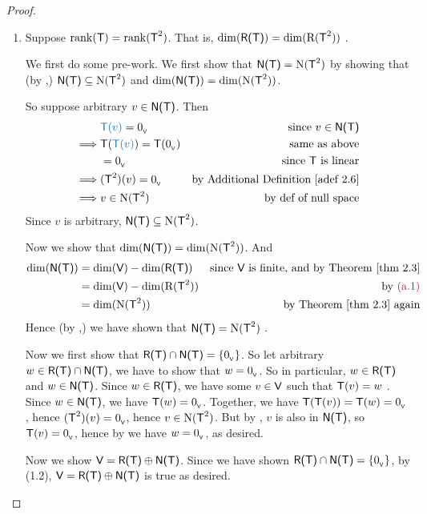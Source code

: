 \begin{proof} \ 

\begin{enumerate}
\item Suppose \(\mathrm{rank}(\textsf{T}) = \mathrm{rank}(\textsf{T}^2)\).
That is, \(\dim(\textsf{R(T)}) = \dim(\mathrm{R}(\textsf{T}^2))\) .

We first do some pre-work.
We first show that \(\textsf{N(T)} = \mathrm{N}(\textsf{T}^2)\) by showing that (by ,) \(\textsf{N(T)} \subseteq \mathrm{N}(\textsf{T}^2)\) and \(\dim(\textsf{N(T)}) = \dim(\mathrm{N}(\textsf{T}^2))\).

So suppose arbitrary \(v \in \textsf{N(T)}\).
Then
\begin{align*}
             & \BLUE{\T(v)} = \OV & \text{since \(v \in \NULLT\)} \\
    \implies & \T(\BLUE{\T(v)}) = \T(\OV) & \text{same as above} \\
             & = \OV & \text{since \(\T\) is linear} \\
    \implies & (\T^2)(v) = \OV & \text{by \ADEF{2.6}} \\
    \implies & v \in \NULL(\T^2) & \text{by def of null space}
\end{align*}
Since \(v\) is arbitrary, \(\textsf{N(T)} \subseteq \mathrm{N}(\textsf{T}^2)\).

Now we show that \(\dim(\textsf{N(T)}) = \dim(\mathrm{N}(\textsf{T}^2))\).
And
\begin{align*}
    \dim(\NULLT) & = \dim(\V) - \dim(\RANGET) & \text{since \(\V\) is finite, and by \THM{2.3}} \\
                 & = \dim(\V) - \dim(\RANGE(\T^2)) & \text{by \MAROON{(a.1)}} \\
                 & = \dim(\NULL(\T^2)) & \text{by \THM{2.3} again}
\end{align*}
Hence (by ,) we have shown that \(\textsf{N(T)} = \mathrm{N}(\textsf{T}^2)\) .

Now we first show that \(\textsf{R(T)} \cap \textsf{N(T)} = \{ 0_{_{\textsf{V}}} \}\).
So let arbitrary \(w \in \textsf{R(T)} \cap \textsf{N(T)}\), we have to show that \(w = 0_{_{\textsf{V}}}\).
So in particular, \(w \in \textsf{R(T)}\) and \(w \in \textsf{N(T)}\).
Since \(w \in \textsf{R(T)}\), we have some \(v \in \textsf{V}\) such that \(\textsf{T}(v) = w\) .
Since \(w \in \textsf{N(T)}\), we have \(\textsf{T}(w) = 0_{_{\textsf{V}}}\).
Together, we have \(\textsf{T}(\textsf{T}(v)) = \textsf{T}(w) = 0_{_{\textsf{V}}}\), hence \((\textsf{T}^2)(v) = 0_{_{\textsf{V}}}\), hence \(v \in \mathrm{N}(\textsf{T}^2)\).
But by , \(v\) is also in \(\textsf{N(T)}\), so \(\textsf{T}(v) = 0_{_{\textsf{V}}}\), hence by  we have \(w = 0_{_{\textsf{V}}}\), as desired.

Now we show \(\textsf{V} = \textsf{R(T)} \oplus \textsf{N(T)}\).
Since we have shown \(\textsf{R(T)} \cap \textsf{N(T)} = \{ 0_{_{\textsf{V}}} \}\), by (1.2), \(\textsf{V} = \textsf{R(T)} \oplus \textsf{N(T)}\) is true as desired.


\end{enumerate}
\end{proof}
